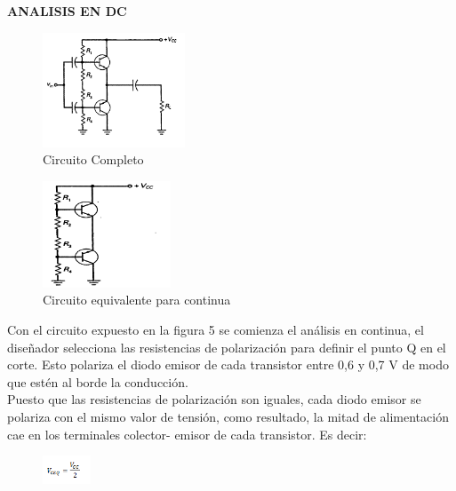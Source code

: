 \documentclass[10pt,a4paper]{article}
\begin{document}
\newpage
\textbf{ANALISIS EN DC}\\
\begin{center}
\begin{figure}[hbtp]
\centering
\includegraphics[scale=0.7]{4.png}
\caption{Circuito Completo }
\end{figure}
\end{center}
\begin{center}
\begin{figure}[hbtp]
\centering
\includegraphics[scale=0.7]{5.png}
\caption{Circuito equivalente para continua}
\end{figure}
\end{center}
Con el circuito expuesto en la figura 5 se comienza el análisis en continua, el diseñador selecciona las resistencias de polarización para definir el punto Q en el corte. Esto polariza el diodo emisor de cada transistor entre 0,6 y 0,7 V de modo que estén al borde la conducción.\\
Puesto que las resistencias de polarización son iguales, cada diodo emisor se polariza con el mismo valor de tensión, como resultado, la mitad de alimentación cae en los terminales colector- emisor de cada transistor. Es decir:\\
\begin{figure}[hbtp]
\centering
\includegraphics[scale=0.7]{6.png}
\end{figure}
\end{document}
